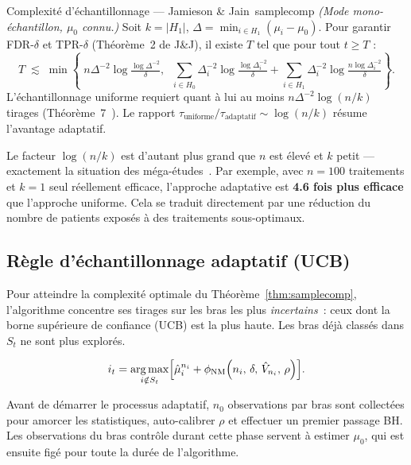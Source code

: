 \documentclass[10.5pt,a4paper]{article}
\newcommand{\muhat}{\hat{\mu}}
\newcommand{\Hnull}{H_0}
\newcommand{\Halt}{H_1}
\newcommand{\phinm}{\phi_{\mathrm{NM}}}
\begin{document}
\begin{theorem}{Complexit\'e d'\'echantillonnage --- Jamieson \& Jain~\cite{jamieson2019}}{samplecomp}
\emph{(Mode mono-\'echantillon, $\mu_0$ connu.)}
Soit $k = |\Halt|$, $\Delta = \min_{i\in\Halt}(\mu_i-\mu_0)$.
Pour garantir FDR-$\delta$ et TPR-$\delta$ (Th\'eor\`eme~2 de J\&J),
il existe $T$ tel que pour tout $t \geq T$ :
\[
  T \;\lesssim\; \min\!\left\{\;
    n\Delta^{-2}\log\!\tfrac{\log\Delta^{-2}}{\delta},\;\;
    \sum_{i\in\Hnull}\!\Delta_i^{-2}\log\!\tfrac{\log\Delta_i^{-2}}{\delta}
    +
    \sum_{i\in\Halt}\!\Delta_i^{-2}\log\!\tfrac{n\log\Delta_i^{-2}}{\delta}
  \right\}.
\]
L'\'echantillonnage uniforme requiert quant \`a lui au moins
$n\Delta^{-2}\log(n/k)$ tirages (Th\'eor\`eme~7~\cite{jamieson2019}). Le rapport
$\tau_{\text{uniforme}} / \tau_{\text{adaptatif}} \sim \log(n/k)$
r\'esume l'avantage adaptatif.
\end{theorem}

\begin{keyidea}
Le facteur $\log(n/k)$ est d'autant plus grand que $n$ est \'elev\'e et
$k$ petit --- exactement la situation des m\'ega-\'etudes~\cite{bowen2022}.
Par exemple, avec $n = 100$ traitements et $k = 1$ seul r\'eellement
efficace, l'approche adaptative est \textbf{4.6 fois plus efficace} que
l'approche uniforme. Cela se traduit directement par une r\'eduction du
nombre de patients expos\'es \`a des traitements sous-optimaux.
\end{keyidea}

\subsection{R\`egle d'\'echantillonnage adaptatif (UCB)}

Pour atteindre la complexit\'e optimale du
Th\'eor\`eme~\ref{thm:samplecomp}, l'algorithme concentre ses tirages
sur les bras les plus \emph{incertains}~: ceux dont la borne sup\'erieure
de confiance (UCB) est la plus haute. Les bras d\'ej\`a class\'es dans
$S_t$ ne sont plus explor\'es.

\[
  i_t = \underset{i \notin S_t}{\arg\max}
    \Bigl[\muhat_i^{n_i}
          + \phinm\!\left(n_i,\, \delta,\, \hat{V}_{n_i},\, \rho\right)\Bigr].
\]

\begin{pratique}
Avant de d\'emarrer le processus adaptatif, $n_0$ observations par bras
sont collect\'ees pour amorcer les statistiques, auto-calibrer $\rho$ et
effectuer un premier passage BH. Les observations du bras contr\^ole
durant cette phase servent \`a estimer $\mu_0$, qui est ensuite fig\'e
pour toute la dur\'ee de l'algorithme.
\end{pratique}
\end{document}
